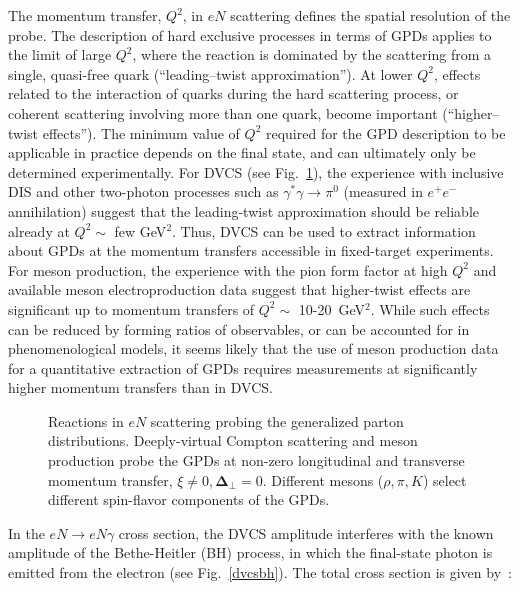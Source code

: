 The momentum transfer, $Q^2$, in $eN$ scattering defines the spatial 
resolution of the probe.  The description of hard exclusive processes in 
terms of GPDs applies to the limit of large $Q^2$, where the reaction is 
dominated by the scattering from a single, quasi-free quark (``leading--twist 
approximation'').  At lower $Q^2$, effects related to the interaction of 
quarks during the hard scattering process, or coherent scattering involving 
more than one quark, become important (``higher--twist effects'').  The 
minimum value of $Q^2$ required for the GPD description to be applicable in 
practice depends on the final state, and can ultimately only be determined 
experimentally.  For DVCS (see Fig.~\ref{fig:handbag}), the experience with 
inclusive DIS and other two-photon processes such as 
$\gamma^* \gamma \to \pi^0$ (measured in $e^+e^-$ annihilation) suggest that 
the leading-twist approximation should be reliable already at $Q^2 \sim$ few 
GeV$^2$.   Thus, DVCS can be used to extract information about GPDs at the 
momentum transfers accessible in fixed-target experiments.  For meson 
production, the experience with the pion form factor at high $Q^2$ and 
available meson electroproduction data suggest that higher-twist effects 
are significant up to momentum transfers of $Q^2 \sim$ 10-20~GeV$^2$. While 
such effects can be reduced by forming ratios of observables, or can be 
accounted for in phenomenological models, it seems likely that the use of 
meson production data for a quantitative extraction of GPDs requires 
measurements at significantly higher momentum transfers than in DVCS.

\begin{figure}[t]
\vspace{5.0cm}
\caption{\small{Reactions in $eN$ scattering probing the generalized parton 
distributions.  Deeply-virtual Compton scattering and meson production 
probe the GPDs at non-zero longitudinal and transverse momentum transfer, 
$\xi \neq 0, \bm{\Delta}_\perp = 0$. Different mesons ($\rho, \pi, K$) 
select different spin-flavor components of the GPDs.}}
\label{fig:handbag}
\end{figure}

In the $eN \to eN\gamma$ cross section, the DVCS amplitude interferes 
with the known amplitude of the Bethe-Heitler (BH) process, in which the 
final-state photon is emitted from the electron (see Fig.~\ref{dvcsbh}). 
The total cross section is given by~\cite{Belitsky:2001ns}:

